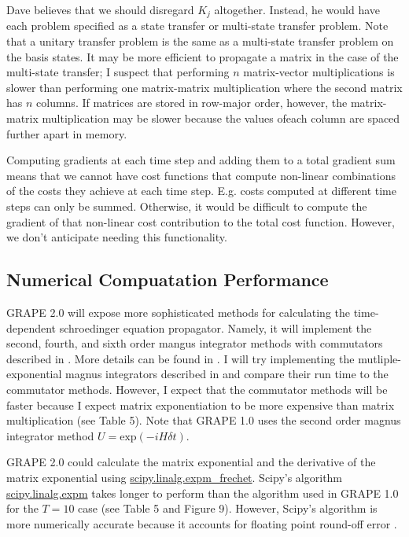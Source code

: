 \documentclass[letterpaper, 12pt]{article}
\begin{document}
Dave believes that we should disregard $K_{j}$ altogether. Instead, he would have each problem specified as a state transfer or multi-state transfer problem. Note that a unitary transfer problem is the same as a multi-state transfer problem on the basis states. It may be more efficient to propagate a matrix in the case of the multi-state transfer; I suspect that performing $n$ matrix-vector multiplications is slower than performing one matrix-matrix multiplication where the second matrix has $n$ columns. If matrices are stored in row-major order, however, the matrix-matrix multiplication may be slower because the values ofeach column are spaced further apart in memory.

Computing gradients at each time step and adding them to a total gradient sum means that we cannot have cost functions that compute non-linear combinations of the costs they achieve at each time step. E.g. costs computed at different time steps can only be summed. Otherwise, it would be difficult to compute the gradient of that non-linear cost contribution to the total cost function. However, we don't anticipate needing this functionality.

\subsection{Numerical Compuatation Performance}
GRAPE 2.0 will expose more sophisticated methods for calculating the time-dependent schroedinger equation propagator. Namely, it will implement the second, fourth, and sixth order mangus integrator methods with commutators described in \cite{auer2018magnus}. More details can be found in \cite{blanes2009magnus}. I will try implementing the mutliple-exponential magnus integrators described in \cite{auer2018magnus} and compare their run time to the commutator methods. However, I expect that the commutator methods will be faster because I expect matrix exponentiation to be more expensive than matrix multiplication (see Table 5). Note that GRAPE 1.0 uses the second order magnus integrator method $U = \textrm{exp}(-i H \delta t)$.

GRAPE 2.0 could calculate the matrix exponential and the derivative of the matrix exponential using \href{https://docs.scipy.org/doc/scipy-0.14.0/reference/generated/scipy.linalg.expm_frechet.html}{scipy.linalg.expm\_frechet}. Scipy's algorithm \href{https://docs.scipy.org/doc/scipy-0.14.0/reference/generated/scipy.linalg.expm.html#scipy.linalg.expm}{scipy.linalg.expm} takes longer to perform than the algorithm used in GRAPE 1.0 for the $T = 10$ case (see Table 5 and Figure 9). However, Scipy's algorithm is more numerically accurate because it accounts for floating point round-off error \cite{al2009new}.
\end{document}
